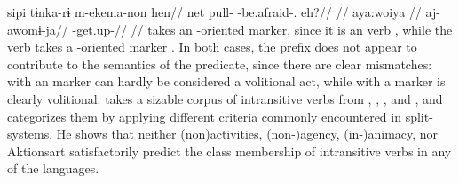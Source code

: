  \kalina
{}
\begingl
\gla sipi tɨnka-rɨ m-ekema-non hen//
\glb net pull- -be.afraid-. eh?//
\glft {} \parencite[][253]{courtz2008carib}//
\endgl
{}
\begingl
\glpreamble aya:woiya //
\gla aj-awomɨ-ja//
\glb {}-get.up-//
\glft {} \parencite[][167]{hoff1968carib}//
\endgl
\xe
%
  takes an -oriented marker, since it is an  verb , while the  verb   takes a -oriented marker .
In both cases, the prefix does not appear to contribute to the semantics of the predicate, since there are clear mismatches:
 with an  marker can hardly be considered a volitional act, while   with a  marker is clearly volitional.
\textcite{meira2000split} takes a sizable corpus of intransitive verbs from \trio, \kalina, \apalai, and \wayana, and categorizes them by applying different criteria commonly encountered in split- systems.
He shows that neither (non\-)activities, %
(non-)agency, %
(in-)animacy, %
nor Aktionsart %
satisfactorily predict the class membership of intransitive verbs in any of the languages.

